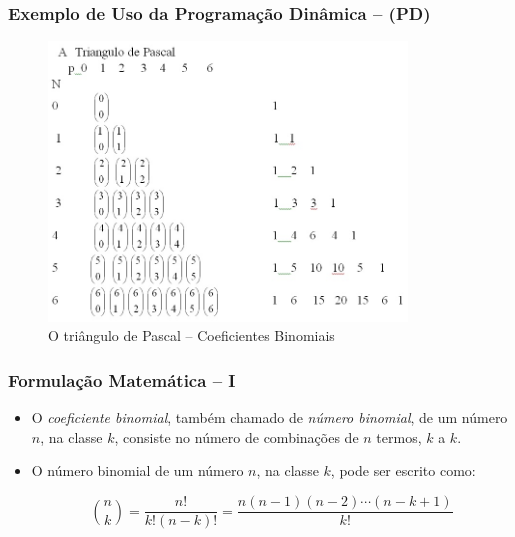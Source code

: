 \begin{frame}[fragile]

\frametitle{Exemplo de Uso da Programação Dinâmica -- (PD)}

\begin{figure}[!htb]
\centering
\includegraphics[width=0.850\textwidth, height=0.650\textheight]{figures/pascal_triangle_02.jpg}
\caption{O triângulo de Pascal -- Coeficientes Binomiais}
\end{figure}
    
\end{frame}


\begin{frame}[fragile]

\frametitle{Formulação Matemática -- I}

\begin{itemize}
  \item O \textit{coeficiente binomial}, também chamado de \textit{número binomial}, 
de um número $n$, na classe $k$, consiste no número de combinações de $n$ termos, $k$ a $k$. 

\pause
  \item O número binomial de um número $n$, na classe $k$, pode ser escrito como:

$$ {n \choose k}= \frac {n!}{k!(n-k)!}=\frac {n(n-1)(n-2)\cdots(n-k+1)}{k!}$$
\end{itemize}   
    
\end{frame}



